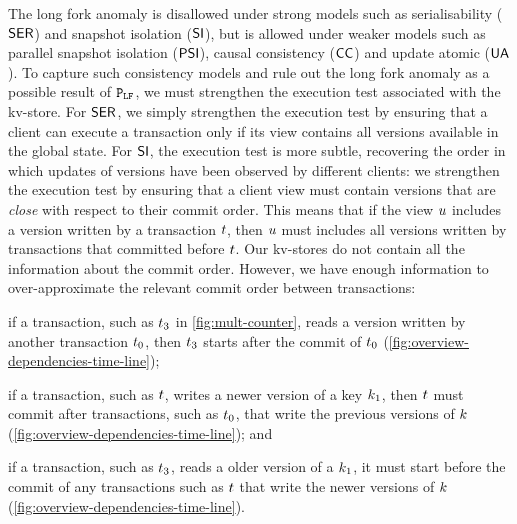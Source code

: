 The long fork anomaly is disallowed under strong models 
such as serialisability (\(\mathsf{SER}\)) and snapshot isolation (\(\mathsf{SI}\)), 
but is allowed under weaker models such as parallel snapshot isolation (\(\mathsf{PSI}\)), causal consistency (\(\mathsf{CC}\)) and update atomic (\( \mathsf{UA} \)).
To capture such consistency models and rule out the long fork anomaly as a possible result 
of \(\mathtt{P}_{\mathtt{LF}}\), we must strengthen the execution test associated with the kv-store.
For \(\mathsf{SER}\), we simply strengthen the execution test by ensuring that a client can execute a transaction 
only if its view contains all versions available in the global state.
For \(\mathsf{SI}\), the execution test is more subtle,  recovering  the order in which 
updates of versions have been observed by different clients:
we strengthen the execution test by ensuring that a client view must contain versions 
that are \emph{close} with respect to their commit order.
This means that if the view \( u \) includes a version written by a transaction \( t \),
then \( u \) must includes all versions written by transactions that committed before \( t \).
Our kv-stores do not contain all the information about the commit order.
However, we have enough information to over-approximate the relevant commit order between transactions:
\begin{enumerate*}
\item if a transaction, such as \( t_3 \) in \cref{fig:mult-counter},
reads a version written by another transaction \( t_0 \),
then \( t_3 \) starts after the commit of \( t_0 \) (\cref{fig:overview-dependencies-time-line});
\item if a transaction, such as \( t \),
writes a newer version of a key \( k_1 \), 
then \( t \) must commit after transactions, such as \( t_0 \), that write the previous versions of \( k \) (\cref{fig:overview-dependencies-time-line}); and
\item if a transaction, such as \( t_3 \), reads a older version of a \( k_1 \),
it must start before the commit of any transactions such as \( t \) that write the newer versions of \( k \) (\cref{fig:overview-dependencies-time-line}).
\end{enumerate*}


